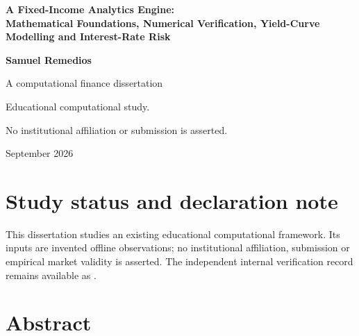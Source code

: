 \documentclass[12pt,a4paper]{report}
\numberwithin{equation}{chapter}
\begin{document}
\hypersetup{pageanchor=false}
\begin{titlepage}
\centering
\vspace*{2.5cm}
{\LARGE\bfseries A Fixed-Income Analytics Engine:\\[0.35cm]
Mathematical Foundations, Numerical Verification,
Yield-Curve Modelling and Interest-Rate Risk\par}
\vspace{3cm}
{\Large\bfseries Samuel Remedios\par}
\vfill
{\large A computational finance dissertation\par}
\vspace{1.3cm}
{\small Educational computational study.\par
No institutional affiliation or submission is asserted.\par}
\vspace{0.8cm}
{\large September 2026\par}
\end{titlepage}
\clearpage
\fontsize{11pt}{13.5pt}\selectfont
\setlength{\parindent}{0pt}
\setlength{\parskip}{\baselineskip}
\setcounter{page}{1}
\hypersetup{pageanchor=true}
\chapter*{Study status and declaration note}
This dissertation studies an existing educational computational framework.
Its inputs are invented offline observations; no institutional affiliation,
submission or empirical market validity is asserted.
The independent internal verification record remains available as
.
\chapter*{Abstract}

\clearpage
\tableofcontents
\clearpage
{}
\setcounter{page}{1}










\clearpage
\printbibliography[heading=bibintoc,title={References}]
\appendix
{}


\end{document}
